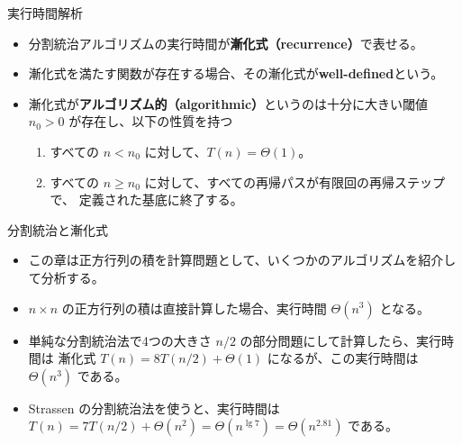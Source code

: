 \documentclass[unicode,11pt,aspectratio=169,notes]{beamer} %
\begin{document}
\begin{frame}{実行時間解析}
  \begin{itemize}
    \item 分割統治アルゴリズムの実行時間が\textbf{漸化式（recurrence）}で表せる。
    \item 漸化式を満たす関数が存在する場合、その漸化式が\textbf{well-defined}という。
    \item 漸化式が\textbf{アルゴリズム的（algorithmic）}というのは十分に大きい閾値
    $n_0>0$ が存在し、以下の性質を持つ
    \begin{enumerate}
      \item すべての $n<n_0$ に対して、$T(n)=\Theta(1)$。
      \item すべての $n\geq n_0$ に対して、すべての再帰パスが有限回の再帰ステップで、
      定義された基底に終了する。
    \end{enumerate}
  \end{itemize}
\end{frame}


\begin{frame}{分割統治と漸化式}
  \begin{itemize}
  \item この章は正方行列の積を計算問題として、いくつかのアルゴリズムを紹介して分析する。
  \item $n\times n$ の正方行列の積は直接計算した場合、実行時間 $\Theta(n^3)$ となる。
  \item 単純な分割統治法で4つの大きさ $n/2$ の部分問題にして計算したら、実行時間は
  漸化式 $T(n) = 8T(n/2) + \Theta(1)$ になるが、この実行時間は $\Theta(n^3)$ である。
  \item Strassen の分割統治法を使うと、実行時間は
  $T(n) = 7T(n/2) + \Theta(n^2) = \Theta(n^{\lg 7}) = \Theta(n^{2.81})$ である。
  \end{itemize}
\end{frame}

\end{document}
